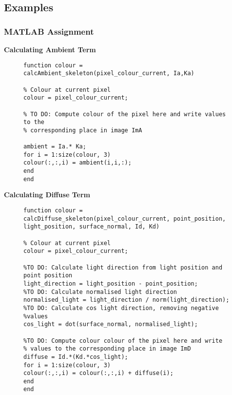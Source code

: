 \subsection{Examples}
\subsubsection{MATLAB Assignment}
\textbf{Calculating Ambient Term}
\begin{figure}[!hbt]
\begin{lstlisting}
function colour = calcAmbient_skeleton(pixel_colour_current, Ia,Ka)

% Colour at current pixel
colour = pixel_colour_current;

% TO DO: Compute colour of the pixel here and write values to the
% corresponding place in image ImA 

ambient = Ia.* Ka;
for i = 1:size(colour, 3)
colour(:,:,i) = ambient(i,i,:);
end
end
\end{lstlisting}	
\end{figure}

\textbf{Calculating Diffuse Term}
\begin{figure}[!hbt]
	\begin{lstlisting}
function colour = calcDiffuse_skeleton(pixel_colour_current, point_position, light_position, surface_normal, Id, Kd)

% Colour at current pixel
colour = pixel_colour_current;

%TO DO: Calculate light direction from light position and point position
light_direction = light_position - point_position;
%TO DO: Calculate normalised light direction
normalised_light = light_direction / norm(light_direction);
%TO DO: Calculate cos light direction, removing negative
%values
cos_light = dot(surface_normal, normalised_light);

%TO DO: Compute colour colour of the pixel here and write
% values to the corresponding place in image ImD
diffuse = Id.*(Kd.*cos_light);
for i = 1:size(colour, 3)
colour(:,:,i) = colour(:,:,i) + diffuse(i);
end
end
	\end{lstlisting}	
\end{figure}

\newpage

